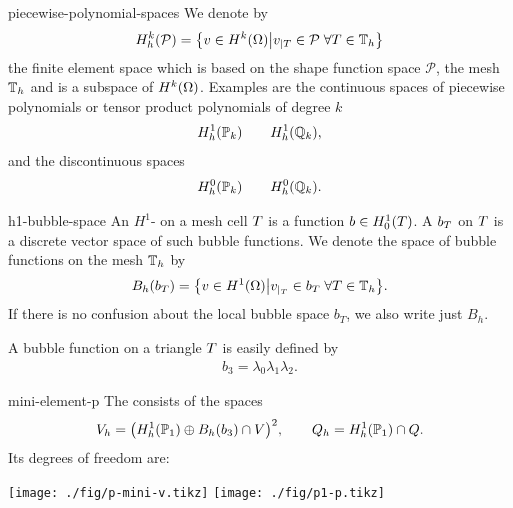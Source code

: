 \begin{Notation}{piecewise-polynomial-spaces}
  We denote by
  \begin{gather}
    \label{eq:stokes:8}
    H^k_h(\mathcal P) =
    \bigl\{ v\in H^k(\Omega) \big\vert
    v_{|\cell} \in \mathcal P \;\forall \cell\in\mesh_h\bigr\}
  \end{gather}
  the finite element space which is based on the shape function space
  $\mathcal P$, the mesh $\mesh_h$ and is a subspace of
  $H^k(\domain)$. Examples are the continuous spaces of piecewise
  polynomials or tensor product polynomials of degree $k$
  \begin{gather*}
    H^1_h(\P_k) \qquad H^1_h(\Q_k),
  \end{gather*}
  and the discontinuous spaces
  \begin{gather*}
    H^0_h(\P_k) \qquad H^0_h(\Q_k).
  \end{gather*}
\end{Notation}

\begin{Definition}{h1-bubble-space}
  An $H^1$- on a mesh cell $\cell$ is a
  function $b\in H^1_0(\cell)$. A  $b_\cell$ on
  $\cell$ is a discrete vector space of such bubble functions.  We
  denote the space of bubble functions on the mesh $\mesh_h$ by
  \begin{gather*}
    B_h(b_\cell) = \bigl\{ v\in H^1(\domain) \big\vert
    v_{|_\cell} \in b_\cell \;\forall \cell\in\mesh_h
    \bigr\}.
  \end{gather*}
  If there is no confusion about the local bubble space $b_T$, we also
  write just $B_h$.
\end{Definition}

\begin{example}
  A bubble function on a triangle $\cell$ is easily defined by
  \begin{gather}
    \label{eq:stokes:7}
    b_3 = \lambda_0\lambda_1\lambda_2.
  \end{gather}
\end{example}

\begin{Definition}{mini-element-p}
  The  consists of the spaces
  \begin{gather}
    V_h = \bigl(H^1_h(\P_1) \oplus B_h(b_3) \cap V\bigr)^2,
    \qquad
    Q_h = H^1_h(\P_1) \cap Q.
  \end{gather}
  Its degrees of freedom are:
  \begin{center}
    \texttt{[image: ./fig/p-mini-v.tikz]}
    \hspace{1cm}
    \texttt{[image: ./fig/p1-p.tikz]}
  \end{center}
\end{Definition}

